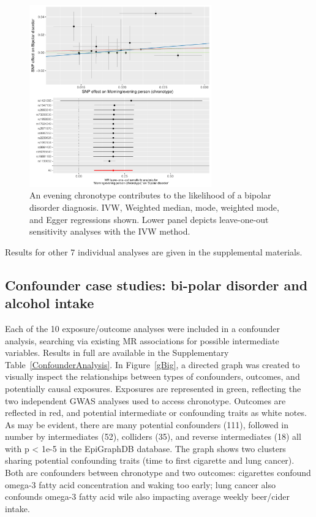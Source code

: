\documentclass[journal,article,submit,moreauthors,pdftex]{Definitions/mdpi}
\begin{document}
\begin{figure}[htbp]
	\centering
    \includegraphics[width=0.7\textwidth]{Figs/Analysis2/Morning_evening_person_(chronotype)_vs_Bipolar_disorder.Plots.pdf}
    \caption{An evening chronotype contributes to the likelihood of a bipolar disorder diagnosis. IVW, Weighted median, mode, weighted mode, and Egger regressions shown. Lower panel depicts leave-one-out sensitivity analyses with the IVW method.}
	\label{bipolar}
\end{figure}

Results for other 7 individual analyses are given in the supplemental materials.


\subsection{Confounder case studies: bi-polar disorder and alcohol intake}
Each of the 10 exposure/outcome analyses were included in a confounder analysis, searching via existing MR associations for possible intermediate variables. Results in full are available in the Supplementary Table~\ref{ConfounderAnalysis}. In Figure~\ref{gBig}, a directed graph was created to visually inspect the relationships between types of confounders, outcomes, and potentially causal exposures. Exposures are represented in green, reflecting the two independent GWAS analyses used to access chronotype. Outcomes are reflected in red, and potential intermediate or confounding traits as white notes. As may be evident, there are many potential confounders (111), followed in number by intermediates (52), colliders (35), and reverse intermediates (18) all with p < 1e-5 in the EpiGraphDB database. The graph shows two clusters sharing potential confounding traits (time to first cigarette and lung cancer). Both are confounders between chronotype and two outcomes: cigarettes confound omega-3 fatty acid concentration and waking too early; lung cancer also confounds omega-3 fatty acid wile also impacting average weekly beer/cider intake.
\end{document}
